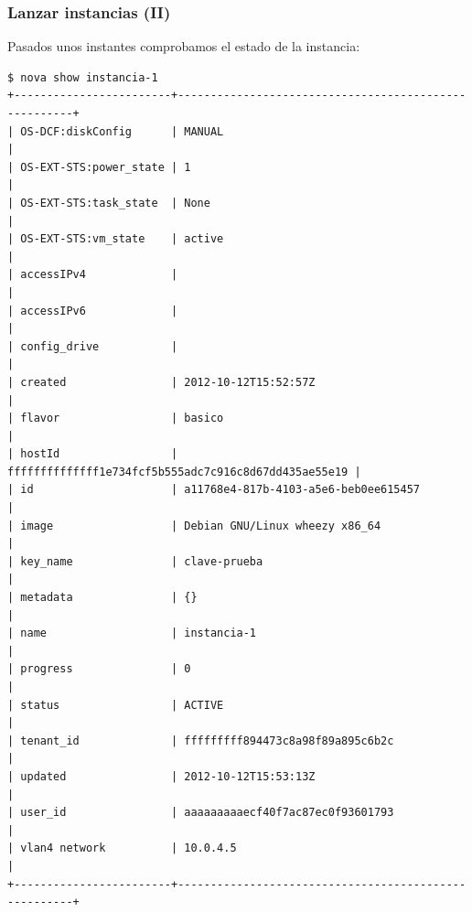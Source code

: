 \documentclass{beamer}
\begin{document}
\begin{frame}[fragile]
  \frametitle{Lanzar instancias (II)}
  Pasados unos instantes comprobamos el estado de la instancia:
\begin{lstlisting}[style=consola]
$ nova show instancia-1
+------------------------+------------------------------------------------------+
| OS-DCF:diskConfig      | MANUAL                                               |
| OS-EXT-STS:power_state | 1                                                    |
| OS-EXT-STS:task_state  | None                                                 |
| OS-EXT-STS:vm_state    | active                                               |
| accessIPv4             |                                                      |
| accessIPv6             |                                                      |
| config_drive           |                                                      |
| created                | 2012-10-12T15:52:57Z                                 |
| flavor                 | basico                                               |
| hostId                 | ffffffffffffff1e734fcf5b555adc7c916c8d67dd435ae55e19 |
| id                     | a11768e4-817b-4103-a5e6-beb0ee615457                 |
| image                  | Debian GNU/Linux wheezy x86_64                       |
| key_name               | clave-prueba                                         |
| metadata               | {}                                                   |
| name                   | instancia-1                                          |
| progress               | 0                                                    |
| status                 | ACTIVE                                               |
| tenant_id              | fffffffff894473c8a98f89a895c6b2c                     |
| updated                | 2012-10-12T15:53:13Z                                 |
| user_id                | aaaaaaaaaecf40f7ac87ec0f93601793                     |
| vlan4 network          | 10.0.4.5                                             |
+------------------------+------------------------------------------------------+
\end{lstlisting}
\end{frame}
\end{document}
